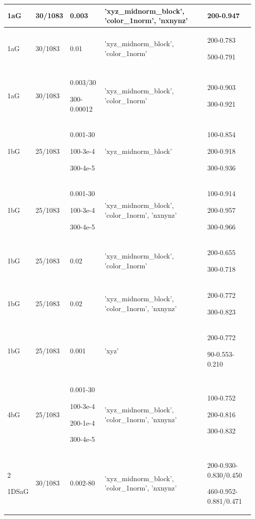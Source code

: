 \documentclass{article}
\begin{document}
\begin{center}
\begin{longtable}{|p{1cm} |p{1.5cm} | p{2cm} | p{3.5cm} || p{4cm}|}
		
		\hline\hline
		1aG & 30/1083 & 0.003 & 'xyz\_midnorm\_block', 'color\_1norm', 'nxnynz'& 200-0.947  \\  [0.5ex]
		\hline		
		1aG & 30/1083 & 0.01  & 'xyz\_midnorm\_block', 'color\_1norm'& 200-0.783 \par 500-0.791  \\  [0.5ex]
		\hline		
		1aG & 30/1083 & 0.003/30 \par 300-0.00012 & 'xyz\_midnorm\_block', 'color\_1norm'& 200-0.903 \par 300-0.921  \\  [0.5ex]
		\hline\hline
		
		1bG & 25/1083 & 0.001-30 \par 100-3e-4 \par 300-4e-5 & 'xyz\_midnorm\_block'& 100-0.854 \par 200-0.918 \par 300-0.936  \\  [0.5ex]
		\hline
		1bG & 25/1083 & 0.001-30 \par 100-3e-4 \par 300-4e-5 & 'xyz\_midnorm\_block', 'color\_1norm', 'nxnynz'& 100-0.914 \par 200-0.957 \par 300-0.966  \\  [0.5ex]
		\hline	
		1bG & 25/1083 & 0.02 & 'xyz\_midnorm\_block', 'color\_1norm'& 200-0.655 \par 300-0.718  \\  [0.5ex]
		\hline
		1bG & 25/1083 & 0.02 & 'xyz\_midnorm\_block', 'color\_1norm', 'nxnynz'& 200-0.772 \par 300-0.823  \\  [0.5ex]
		\hline
		1bG & 25/1083 & 0.001 & 'xyz'& 200-0.772 \par 90-0.553-0.210  \\  [0.5ex]
		\hline \hline
		
		
		4bG & 25/1083 & 0.001-30 \par 100-3e-4 \par 200-1e-4 \par 300-4e-5& 'xyz\_midnorm\_block', 'color\_1norm', 'nxnynz'& 100-0.752 \par 200-0.816 \par 300-0.832  \\  [0.5ex] \hline2
		
		1DSaG & 30/1083 & 0.002-80 & 'xyz\_midnorm\_block', 'color\_1norm', 'nxnynz'& 200-0.930-0.830/0.450 \par 460-0.952-0.881/0.471 \\  [0.5ex] \hline
		

\end{longtable}
\end{center}
\end{document}
